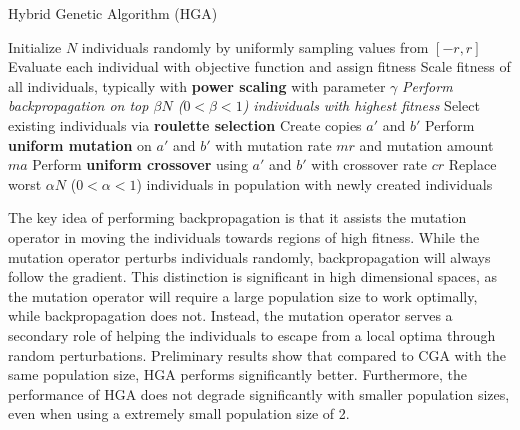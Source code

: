 \begin{algorithm}[h]
\caption{Hybrid Genetic Algorithm (HGA)}
\label{alg:hga}
\begin{algorithmic}
\STATE Initialize $N$ individuals randomly by uniformly sampling values from $[-r, r]$
	\STATE Evaluate each individual with objective function and assign fitness
	\STATE Scale fitness of all individuals, typically with \textbf{power scaling} with parameter $\gamma$
	\STATE \textit{Perform backpropagation on top $\beta N$ ($0 < \beta < 1$) individuals with highest fitness}
	\STATE Select existing individuals via \textbf{roulette selection}
		\STATE Create copies $a'$ and $b'$
		\STATE Perform \textbf{uniform mutation} on $a'$ and $b'$ with mutation rate $mr$ and mutation amount $ma$
		\STATE Perform \textbf{uniform crossover} using $a'$ and $b'$ with crossover rate $cr$
	\ENDFOR
	\STATE Replace worst $\alpha N$ ($0< \alpha < 1$) individuals in population with newly created individuals
\ENDFOR
\end{algorithmic}
\end{algorithm}

The key idea of performing backpropagation is that it assists the mutation operator in moving the individuals towards regions of high fitness. While the mutation operator perturbs individuals randomly, backpropagation will always follow the gradient. This distinction is significant in high dimensional spaces, as the mutation operator will require a large population size to work optimally, while backpropagation does not. Instead, the mutation operator serves a secondary role of helping the individuals to escape from a local optima through random perturbations. Preliminary results show that compared to CGA with the same population size, HGA performs significantly better. Furthermore, the performance of HGA does not degrade significantly with smaller population sizes, even when using a extremely small population size of 2. 
